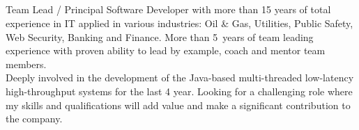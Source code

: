 \documentclass{res}
\newif\ifFullVersion
\begin{document}
\begin{resume}

\section{}
\vspace{8pt} %
\noindent Team Lead / Principal Software Developer with more than 15 years of total experience in IT applied in various industries: Oil \& Gas, Utilities, Public Safety, Web Security, Banking and Finance. More than 5~years of team leading experience with proven ability to lead by example, coach and mentor team members. \\
\ifFullVersion
\indent Strong engineering background, working knowledge and seasoned experience in evolving IT system along with the customer’s business transformation. Able to interact well at all levels, articulate the IT-specific issues to non-IT partners in a clear business-oriented way and translate complex functional requirements into simple, well composed modules. \\
\fi
\indent Deeply involved in the development of the Java-based multi-threaded low-latency high-throughput systems for the last 4 year. Looking for a challenging role where my skills and qualifications will add value and make a significant contribution to the company.

\vspace{8pt}

\end{resume}
\end{document}
